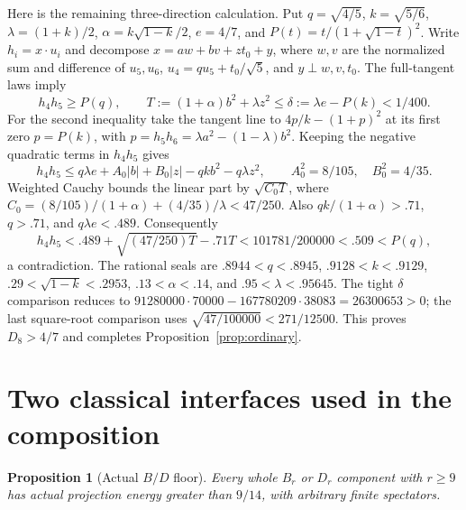 \documentclass[11pt]{article}
\newtheorem{proposition}[theorem]{Proposition}
\theoremstyle{remark}
\begin{document}
Here is the remaining three-direction calculation. Put
$q=\sqrt{4/5}$, $k=\sqrt{5/6}$, $\lambda=(1+k)/2$,
$\alpha=k\sqrt{1-k}/2$, $e=4/7$, and
$P(t)=t/(1+\sqrt{1-t})^2$.
Write $h_i=x\cdot u_i$ and decompose
$x=aw+bv+zt_0+y$, where $w,v$ are the normalized sum and
difference of $u_5,u_6$, $u_4=qu_5+t_0/\sqrt5$, and
$y\perp w,v,t_0$. The full-tangent laws imply
\[
 h_4h_5\ge P(q),\qquad
 T:=(1+\alpha)b^2+\lambda z^2
 \le\delta:=\lambda e-P(k)<1/400.
\]
For the second inequality take the tangent line to
$4p/k-(1+p)^2$ at its first zero $p=P(k)$, with
$p=h_5h_6=\lambda a^2-(1-\lambda)b^2$.
Keeping the negative quadratic terms in $h_4h_5$ gives
\[
 h_4h_5\le q\lambda e+A_0|b|+B_0|z|
              -qkb^2-q\lambda z^2,\qquad
 A_0^2=8/105,\quad B_0^2=4/35.
\]
Weighted Cauchy bounds the linear part by $\sqrt{C_0T}$, where
$C_0=(8/105)/(1+\alpha)+(4/35)/\lambda<47/250$.
Also $qk/(1+\alpha)>.71$, $q>.71$, and $q\lambda e<.489$.
Consequently
\[
 h_4h_5<.489+\sqrt{(47/250)T}-.71T
 <101781/200000<.509<P(q),
\]
a contradiction. The rational seals are
$.8944<q<.8945$, $.9128<k<.9129$,
$.29<\sqrt{1-k}<.2953$, $.13<\alpha<.14$,
and $.95<\lambda<.95645$.
The tight $\delta$ comparison reduces to
$91280000\cdot70000-167780209\cdot38083=26300653>0$;
the last square-root comparison uses
$\sqrt{47/100000}<271/12500$.
This proves $D_8>4/7$ and completes Proposition~\ref{prop:ordinary}.

\section{Two classical interfaces used in the composition}
\label{sec:interfaces}

\begin{proposition}[Actual $B/D$ floor]\label{prop:BDnine}
Every whole $B_r$ or $D_r$ component with $r\ge9$ has actual
projection energy greater than $9/14$, with arbitrary finite
spectators.
\end{proposition}
\end{document}
